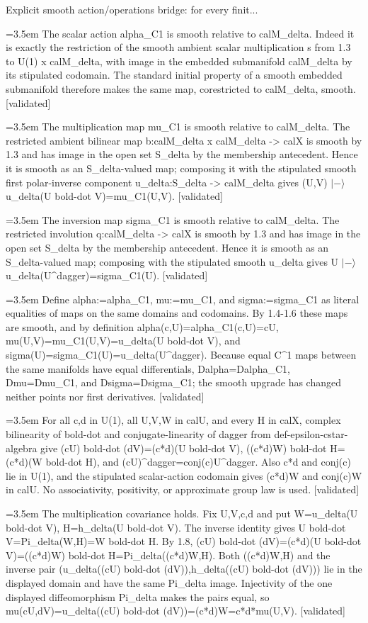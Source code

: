 \documentclass{article}
\newcommand{\step}[1]{\par\noindent\hangindent=3.5em\hangafter=1%
  \makebox[3.5em][l]{\textbf{#1.}}}
\newcommand{\steptag}[1]{\hfill{\small\textsf{[#1]}}}
\begin{document}
\begin{proofbox}{Explicit smooth action/operations bridge: for every finit...}
\step{1.4} The scalar action alpha\_C1 is smooth relative to calM\_delta. Indeed it is exactly the restriction of the smooth ambient scalar multiplication s from 1.3 to U(1) x calM\_delta, with image in the embedded submanifold calM\_delta by its stipulated codomain. The standard initial property of a smooth embedded submanifold therefore makes the same map, corestricted to calM\_delta, smooth. \steptag{validated} \\[4pt]
\step{1.5} The multiplication map mu\_C1 is smooth relative to calM\_delta. The restricted ambient bilinear map b:calM\_delta x calM\_delta -> calX is smooth by 1.3 and has image in the open set S\_delta by the membership antecedent. Hence it is smooth as an S\_delta-valued map; composing it with the stipulated smooth first polar-inverse component u\_delta:S\_delta -> calM\_delta gives (U,V) $|-\rangle$ u\_delta(U bold-dot V)=mu\_C1(U,V). \steptag{validated} \\[4pt]
\step{1.6} The inversion map sigma\_C1 is smooth relative to calM\_delta. The restricted involution q:calM\_delta -> calX is smooth by 1.3 and has image in the open set S\_delta by the membership antecedent. Hence it is smooth as an S\_delta-valued map; composing with the stipulated smooth u\_delta gives U $|-\rangle$ u\_delta(U\textasciicircum{}dagger)=sigma\_C1(U). \steptag{validated} \\[4pt]
\step{1.7} Define alpha:=alpha\_C1, mu:=mu\_C1, and sigma:=sigma\_C1 as literal equalities of maps on the same domains and codomains. By 1.4-1.6 these maps are smooth, and by definition alpha(c,U)=alpha\_C1(c,U)=cU, mu(U,V)=mu\_C1(U,V)=u\_delta(U bold-dot V), and sigma(U)=sigma\_C1(U)=u\_delta(U\textasciicircum{}dagger). Because equal C\textasciicircum{}1 maps between the same manifolds have equal differentials, Dalpha=Dalpha\_C1, Dmu=Dmu\_C1, and Dsigma=Dsigma\_C1; the smooth upgrade has changed neither points nor first derivatives. \steptag{validated} \\[4pt]
\step{1.8} For all c,d in U(1), all U,V,W in calU, and every H in calX, complex bilinearity of bold-dot and conjugate-linearity of dagger from def-epsilon-cstar-algebra give (cU) bold-dot (dV)=(c*d)(U bold-dot V), ((c*d)W) bold-dot H=(c*d)(W bold-dot H), and (cU)\textasciicircum{}dagger=conj(c)U\textasciicircum{}dagger. Also c*d and conj(c) lie in U(1), and the stipulated scalar-action codomain gives (c*d)W and conj(c)W in calU. No associativity, positivity, or approximate group law is used. \steptag{validated} \\[4pt]
\step{1.9} The multiplication covariance holds. Fix U,V,c,d and put W=u\_delta(U bold-dot V), H=h\_delta(U bold-dot V). The inverse identity gives U bold-dot V=Pi\_delta(W,H)=W bold-dot H. By 1.8, (cU) bold-dot (dV)=(c*d)(U bold-dot V)=((c*d)W) bold-dot H=Pi\_delta((c*d)W,H). Both ((c*d)W,H) and the inverse pair (u\_delta((cU) bold-dot (dV)),h\_delta((cU) bold-dot (dV))) lie in the displayed domain and have the same Pi\_delta image. Injectivity of the one displayed diffeomorphism Pi\_delta makes the pairs equal, so mu(cU,dV)=u\_delta((cU) bold-dot (dV))=(c*d)W=c*d*mu(U,V). \steptag{validated} \\[4pt]

\end{proofbox}
\end{document}
